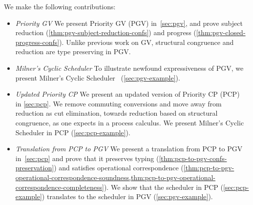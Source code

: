 \documentclass[main.tex]{subfiles}
\begin{document}
We make the following contributions:
\begin{itemize}
\item \emph{Priority GV} We present Priority GV (PGV) in~\cref{sec:pgv}, and prove subject reduction (\cref{thm:pgv-subject-reduction-confs}) and progress (\cref{thm:pgv-closed-progress-confs}). Unlike  previous work on GV, structural congruence and reduction are type preserving in PGV.
\item \emph{Milner's Cyclic Scheduler} To illustrate newfound expressiveness of PGV, we present Milner's Cyclic Scheduler~\cite{milner89} (\cref{sec:pgv-example}).
\item \emph{Updated Priority CP} We present an updated version of Priority CP (PCP)~\cite{dardhagay18} in \cref{sec:pcp}. We remove commuting conversions and move away from reduction as cut elimination, towards reduction based on structural congruence, as one expects in a process calculus. We present Milner's Cyclic Scheduler in PCP (\cref{sec:pcp-example}).
\item \emph{Translation from PCP to PGV} We present a translation from PCP to PGV in~\cref{sec:pcp} and prove that it preserves typing (\cref{thm:pcp-to-pgv-confs-preservation}) and satisfies operational correspondence (\cref{thm:pcp-to-pgv-operational-correspondence-soundness,thm:pcp-to-pgv-operational-correspondence-completeness}). We show that the scheduler in PCP (\cref{sec:pcp-example}) translates to the scheduler in PGV (\cref{sec:pgv-example}).
\end{itemize}
\end{document}
